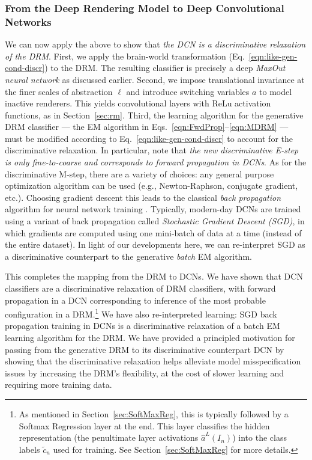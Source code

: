 \documentclass[12pt]{article}
\begin{document}
\subsubsection{From the Deep Rendering Model to Deep Convolutional Networks}
\label{sec:dcn-learning-algo}

We can now apply the above to show that \emph{the DCN is a discriminative relaxation of the DRM}. First, we apply the brain-world transformation (Eq.~\ref{eqn:like-gen-cond-discr}) to the DRM. The resulting classifier is precisely a deep \emph{MaxOut neural network \cite{goodfellow2013maxout}} as discussed earlier. Second, we impose translational invariance at the finer scales of abstraction $\ell$ and introduce switching variables $a$ to model inactive renderers. This yields convolutional layers with ReLu activation functions, as in Section~\ref{sec:rm}. Third, the learning algorithm for the generative DRM classifier --- the EM algorithm in Eqs.~\ref{eqn:FwdProp}--\ref{eqn:MDRM} --- must be modified according to Eq.~\ref{eqn:like-gen-cond-discr} to account for the discriminative relaxation. In particular, note that \emph{the new discriminative E-step is only fine-to-coarse and corresponds to forward propagation in DCNs}. As for the discriminative M-step, there are a variety of choices: any general purpose optimization algorithm can be used (e.g., Newton-Raphson, conjugate gradient, etc.). Choosing gradient descent this leads to the classical \emph{back propagation} algorithm for neural network training \cite{wilamowski2001algorithm}. Typically, modern-day DCNs are trained using a variant of back propagation called \emph{Stochastic Gradient Descent (SGD)}, in which gradients are computed using one mini-batch of data at a time (instead of the entire dataset). In light of our developments here, we can re-interpret SGD as a discriminative counterpart to the generative \emph{batch} EM algorithm\cite{cappe2007onlineEM, jordan1998learning}.

This completes the mapping from the DRM to DCNs. We have shown that DCN classifiers are a discriminative relaxation of DRM classifiers, with forward propagation in a DCN corresponding to inference of the most probable configuration in a DRM.\footnote{As mentioned in Section~\ref{sec:SoftMaxReg}, this is typically followed by a Softmax Regression layer at the end. This layer classifies the hidden representation (the penultimate layer activations $\hat{a}^{L}(I_{n})$) into the class labels $\tilde{c}_{n}$ used for training. See Section~\ref{sec:SoftMaxReg} for more details.} 
We have also re-interpreted learning: SGD back propagation training in DCNs is a discriminative relaxation of a batch EM learning algorithm for the DRM. We have provided a principled motivation for passing from the generative DRM to its discriminative counterpart DCN by showing that the discriminative relaxation helps alleviate model misspecification issues by increasing the DRM's flexibility, at the cost of slower learning and requiring more training data.
\end{document}
